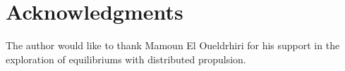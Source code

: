 \documentclass[journal]{new-aiaa}
\begin{document}
%
%
%
%
%
%



\section*{Acknowledgments}
The author would like to thank Mamoun El Oueldrhiri for his support in the exploration of equilibriums with distributed propulsion.


\end{document}

